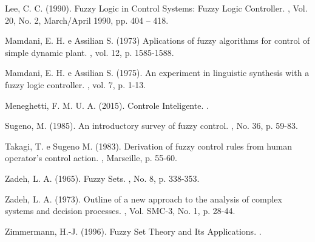 \documentclass[
	twoside,				%
	twocolumn,				%
	english,				%
	brazil,					%
]{article}
\begin{document}
\begin{thebibliography}{99} %

Lee, C. C. (1990).
\newblock Fuzzy Logic in Control Systems: Fuzzy Logic Controller.
, Vol. 20, No. 2, March/April 1990, pp. 404 – 418.

Mamdani, E. H. e Assilian S. (1973)
\newblock Aplications of fuzzy algorithms for control of simple dynamic plant.
, vol. 12, p. 1585-1588.

Mamdani, E. H. e Assilian S. (1975).
\newblock An experiment in linguistic synthesis with a fuzzy logic controller.
, vol. 7, p. 1-13.

Meneghetti, F. M. U. A. (2015).
\newblock Controle Inteligente.
.

Sugeno, M. (1985).
\newblock An introductory survey of fuzzy control.
, No. 36, p. 59-83.

Takagi, T. e Sugeno M. (1983).
\newblock Derivation of fuzzy control rules from human operator’s control action.
, Marseille, p. 55-60.

Zadeh, L. A. (1965).
\newblock Fuzzy Sets.
, No. 8, p. 338-353.

Zadeh, L. A. (1973).
\newblock Outline of a new approach to the analysis of complex systems and decision processes.
, Vol. SMC-3, No. 1, p. 28-44.

Zimmermann, H.-J. (1996).
\newblock Fuzzy Set Theory and Its Applications.
.

\end{thebibliography}

\end{document}
